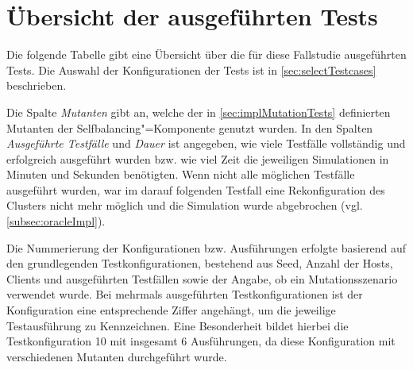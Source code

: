 \chapter{Übersicht der ausgeführten Tests}
\label{app:overviewExecutedTestCases}

Die folgende Tabelle gibt eine Übersicht über die für diese Fallstudie ausgeführten Tests.
Die Auswahl der Konfigurationen der Tests ist in \cref{sec:selectTestcases} beschrieben.

Die Spalte \emph{Mutanten} gibt an, welche der in \cref{sec:implMutationTests} definierten Mutanten der Selfbalancing"=Komponente genutzt wurden.
In den Spalten \emph{Ausgeführte Testfälle} und \emph{Dauer} ist angegeben, wie viele Testfälle vollständig und erfolgreich ausgeführt wurden bzw. wie viel Zeit die jeweiligen Simulationen in Minuten und Sekunden benötigten.
Wenn nicht alle möglichen Testfälle ausgeführt wurden, war im darauf folgenden Testfall eine Rekonfiguration des Clusters nicht mehr möglich und die Simulation wurde abgebrochen (vgl. \cref{subsec:oracleImpl}).

Die Nummerierung der Konfigurationen bzw. Ausführungen erfolgte basierend auf den grundlegenden Testkonfigurationen, bestehend aus Seed, Anzahl der Hosts, Clients und ausgeführten Testfällen sowie der Angabe, ob ein Mutationsszenario verwendet wurde.
Bei mehrmals ausgeführten Testkonfigurationen ist der Konfiguration eine entsprechende Ziffer angehängt, um die jeweilige Testausführung zu Kennzeichnen.
Eine Besonderheit bildet hierbei die Testkonfiguration 10 mit insgesamt 6 Ausführungen, da diese Konfiguration mit verschiedenen Mutanten durchgeführt wurde.

